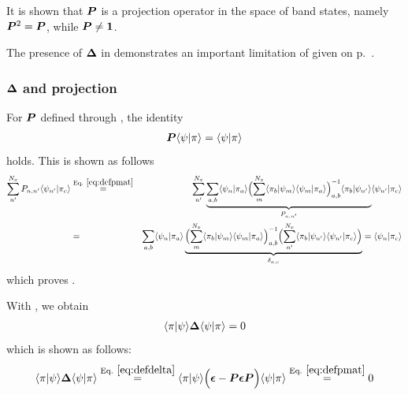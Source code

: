 \documentclass[11pt,a4paper]{report}
\begin{document}
\begin{myshadowminipage}{}
It is shown that $\bm{P}$ is a projection operator in the space of
band states, namely $\bm{P}^2=\bm{P}$, while $\bm{P}\neq \bm{1}$.
\end{myshadowminipage}

The presence of $\bm{\Delta}$ in  demonstrates
an important limitation of  given
on p.~\pageref{eq:greenlocform1}.


\subsubsection{$\bm{\Delta}$ and projection}
For $\bm{P}$ defined through , the identity
\begin{eqnarray}
\bm{P}\langle\psi|\pi\rangle=\langle\psi|\pi\rangle
\label{eq:pprojequalsproj}
\end{eqnarray}
holds. This is shown as follows
\begin{eqnarray}
\sum_{n'}^{N_x}P_{n,n'}\langle\psi_{n'}|\pi_c\rangle
&\eqrel{eq:defpmat}{=}&\sum_{n'}^{N_x}
\underbrace{\sum_{a,b}\langle\psi_n|\pi_a\rangle
\Bigl(\sum_{m}^{N_x}
\langle\pi_b|\psi_m\rangle\langle\psi_m|\pi_a\rangle \Bigr)^{-1}_{a,b}
\langle\pi_b|\psi_{n'}\rangle}_{P_{n,n'}}
\langle\psi_{n'}|\pi_c\rangle
\nonumber\\
&=&
\sum_{a,b}\langle\psi_n|\pi_a\rangle
\underbrace{\Bigl(\sum_{m}^{N_x}
\langle\pi_b|\psi_m\rangle\langle\psi_m|\pi_a\rangle \Bigr)^{-1}_{a,b}
\Bigl(\sum_{n'}^{N_x}
\langle\pi_b|\psi_{n'}\rangle\langle\psi_{n'}|\pi_c\rangle\Bigr)
}_{\delta_{a,c}}
=\langle\psi_n|\pi_c\rangle
\nonumber
\end{eqnarray}
which proves .

With , we obtain
\begin{eqnarray}
\langle\pi|\psi\rangle\bm{\Delta}\langle\psi|\pi\rangle=0
\end{eqnarray}
which is shown as follows:
\begin{eqnarray}
\langle\pi|\psi\rangle\mat{\Delta}\langle\psi|\pi\rangle
\eqrel{eq:defdelta}{=}
\langle\pi|\psi\rangle
\Bigl(\mat{\epsilon}-\mat{P}\mat{\epsilon}\mat{P}\Bigr)
\langle\psi|\pi\rangle\eqrel{eq:defpmat}{=}0
\nonumber
\end{eqnarray}



\end{document}
